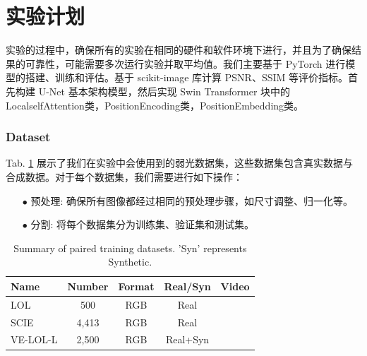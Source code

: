 \documentclass[a4paper, 10pt]{article}
\begin{document}
		\section{实验计划}

		实验的过程中，确保所有的实验在相同的硬件和软件环境下进行，并且为了确保结果的可靠性，可能需要多次运行实验并取平均值。我们主要基于 PyTorch 进行模型的搭建、训练和评估。基于 scikit-image 库计算 PSNR、SSIM 等评价指标。首先构建 U-Net 基本架构模型，然后实现 Swin Transformer 块中的LocalselfAttention类，PositionEncoding类，PositionEmbedding类。

		\subsubsection{Dataset}
		
		Tab. \ref{tab: Paired_training_datases} 展示了我们在实验中会使用到的弱光数据集，这些数据集包含真实数据与合成数据。对于每个数据集，我们需要进行如下操作：
		
		\begin{itemize}
			\item [$\bullet$]
			预处理: 确保所有图像都经过相同的预处理步骤，如尺寸调整、归一化等。
			
			\item [$\bullet$]
			分割: 将每个数据集分为训练集、验证集和测试集。
		\end{itemize}
		
		\begin{table}[!htbp]
			\centering
			\tiny
				\begin{tabular}{>{\centering\arraybackslash}m{2.5cm}|c|c|c|c}
					
					\hline
					
					\textbf{Name} & \textbf{Number} & \textbf{Format} & \textbf{Real/Syn} & \textbf{Video} \\
					
					\hline
					
					LOL\cite{wei2018deep} & 500 & RGB & Real & \\
					
					SCIE\cite{cai2018learning} & 4,413 & RGB & Real & \\
					
					VE-LOL-L\cite{jiang2019learning} & 2,500 & RGB & Real+Syn & \\
					
					\hline
					
				\end{tabular}
			\captionsetup{font=scriptsize} %
			\caption{\label{tab: Paired_training_datases}
				Summary of paired training datasets. 'Syn' represents Synthetic.} %
			
		\end{table}
		
\end{document}
